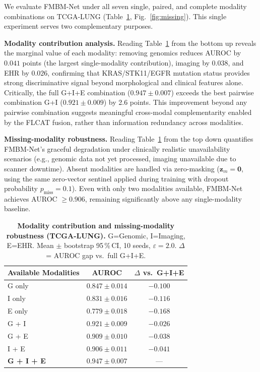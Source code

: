 \documentclass[a4paper,fleqn]{cas-dc}
\begin{document}
We evaluate FMBM-Net under all seven single, paired, and complete modality
combinations on TCGA-LUNG (Table~\ref{tab:missing}, Fig.~\ref{fig:missing}).
This single experiment serves two complementary purposes.

\textbf{Modality contribution analysis.}
Reading Table~\ref{tab:missing} from the bottom up reveals the marginal value
of each modality: removing genomics reduces AUROC by $0.041$ points
(the largest single-modality contribution), imaging by $0.038$, and EHR by
$0.026$, confirming that KRAS/STK11/EGFR mutation status provides strong
discriminative signal beyond morphological and clinical features alone.
Critically, the full G+I+E combination ($0.947\!\pm\!0.007$) exceeds the best
pairwise combination G+I ($0.921\!\pm\!0.009$) by 2.6 points.
This improvement beyond any pairwise combination suggests meaningful
cross-modal complementarity enabled by the FLCAT fusion, rather than
information redundancy across modalities.

\textbf{Missing-modality robustness.}
Reading Table~\ref{tab:missing} from the top down quantifies FMBM-Net's
graceful degradation under clinically realistic unavailability scenarios (e.g.,
genomic data not yet processed, imaging unavailable due to scanner downtime).
Absent modalities are handled via zero-masking
($\mathbf{z}_m\!=\!\mathbf{0}$, using the same zero-vector sentinel applied
during training with dropout probability $p_{\mathrm{miss}}\!=\!0.1$).
Even with only two modalities available, FMBM-Net achieves AUROC $\geq\!0.906$,
remaining significantly above any single-modality baseline.

\begin{table}[!t]
\caption{\textbf{Modality contribution and missing-modality robustness
(TCGA-LUNG).} G=Genomic, I=Imaging, E=EHR. Mean $\pm$ bootstrap 95\,\%\,CI,
10 seeds, $\varepsilon\!=\!2.0$. $\Delta$ = AUROC gap vs.\ full G+I+E.}
\label{tab:missing}
\centering
\renewcommand{\arraystretch}{1.15}
\begin{tabular}{lcc}
\toprule
\textbf{Available Modalities} & \textbf{AUROC} & \textbf{$\Delta$ vs.\ G+I+E}\\
\midrule
G only              & $0.847\!\pm\!0.014$ & $-0.100$\\
I only              & $0.831\!\pm\!0.016$ & $-0.116$\\
E only              & $0.779\!\pm\!0.018$ & $-0.168$\\
G + I               & $0.921\!\pm\!0.009$ & $-0.026$\\
G + E               & $0.909\!\pm\!0.010$ & $-0.038$\\
I + E               & $0.906\!\pm\!0.011$ & $-0.041$\\
\textbf{G + I + E}  & $\mathbf{0.947\!\pm\!0.007}$ & ---\\
\bottomrule
\end{tabular}
\end{table}
\end{document}
